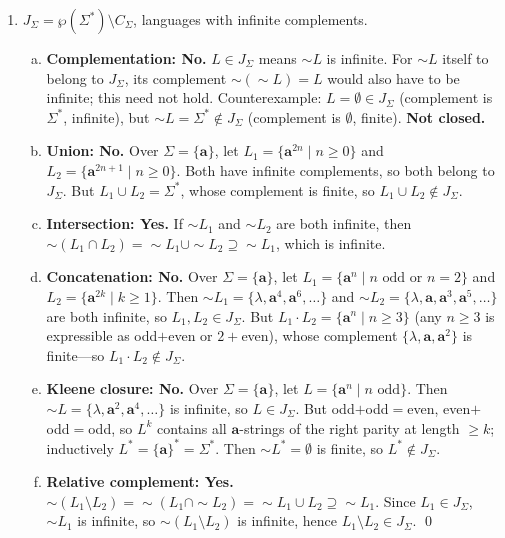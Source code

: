 \begin{enumerate}[{5.}1. ]
\item $J_\Sigma=\wp(\Sigma^*)\setminus C_\Sigma$, languages with infinite complements.

\begin{enumerate}[(a)]
  \item \textbf{Complementation: No.}  $L\in J_\Sigma$ means $\sim L$ is infinite.  For $\sim L$ itself to belong to $J_\Sigma$, its complement $\sim(\sim L)=L$ would also have to be infinite; this need not hold.  Counterexample: $L=\emptyset\in J_\Sigma$ (complement is $\Sigma^*$, infinite), but $\sim L=\Sigma^*\notin J_\Sigma$ (complement is $\emptyset$, finite).  \textbf{Not closed.}
  \item \textbf{Union: No.}  Over $\Sigma=\{\pmb{a}\}$, let
  $L_1=\{\pmb{a}^{2n}\mid n\ge 0\}$ and $L_2=\{\pmb{a}^{2n+1}\mid n\ge 0\}$.
  Both have infinite complements, so both belong to $J_\Sigma$.  But
  $L_1\cup L_2=\Sigma^*$, whose complement is finite, so $L_1\cup L_2\notin J_\Sigma$.
  \item \textbf{Intersection: Yes.}  If $\sim L_1$ and $\sim L_2$ are both infinite, then $\sim(L_1\cap L_2)=\sim L_1\cup\sim L_2\supseteq\sim L_1$, which is infinite.
  \item \textbf{Concatenation: No.}  Over $\Sigma=\{\pmb{a}\}$, let $L_1=\{\pmb{a}^n\mid n\text{ odd or }n=2\}$ and $L_2=\{\pmb{a}^{2k}\mid k\ge 1\}$.  Then $\sim L_1=\{\lambda,\pmb{a}^4,\pmb{a}^6,\ldots\}$ and $\sim L_2=\{\lambda,\pmb{a},\pmb{a}^3,\pmb{a}^5,\ldots\}$ are both infinite, so $L_1,L_2\in J_\Sigma$.  But $L_1\cdot L_2=\{\pmb{a}^n\mid n\ge 3\}$ (any $n\ge 3$ is expressible as odd$+$even or $2+$even), whose complement $\{\lambda,\pmb{a},\pmb{a}^2\}$ is finite---so $L_1\cdot L_2\notin J_\Sigma$.
  \item \textbf{Kleene closure: No.}  Over $\Sigma=\{\pmb{a}\}$, let $L=\{\pmb{a}^n\mid n\text{ odd}\}$.  Then $\sim L=\{\lambda,\pmb{a}^2,\pmb{a}^4,\ldots\}$ is infinite, so $L\in J_\Sigma$.  But odd$+$odd$=$even, even$+$odd$=$odd, so $L^k$ contains all $\pmb{a}$-strings of the right parity at length $\ge k$; inductively $L^*=\{\pmb{a}\}^*=\Sigma^*$.  Then $\sim L^*=\emptyset$ is finite, so $L^*\notin J_\Sigma$.
  \item \textbf{Relative complement: Yes.}  $\sim(L_1\setminus L_2)=\sim(L_1\cap\sim L_2)=\sim L_1\cup L_2\supseteq\sim L_1$.  Since $L_1\in J_\Sigma$, $\sim L_1$ is infinite, so $\sim(L_1\setminus L_2)$ is infinite, hence $L_1\setminus L_2\in J_\Sigma$. \qed
\end{enumerate}


\end{enumerate}

